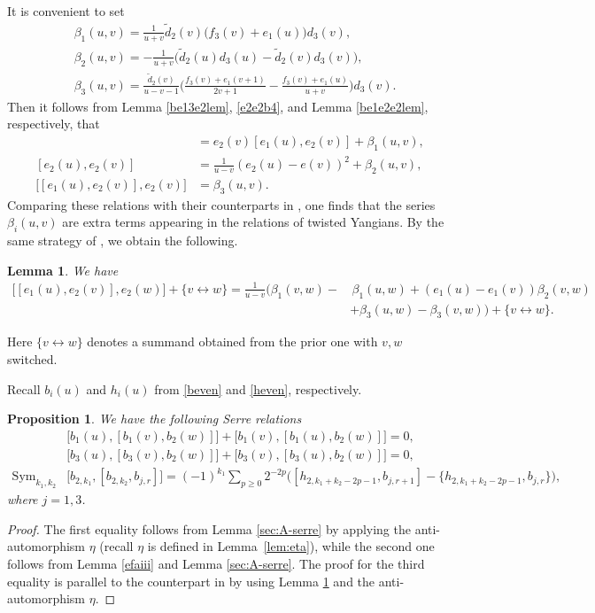 \documentclass[11pt,reqno]{amsart}
\numberwithin{equation}{section}
\newtheorem{prop}[thm]{Proposition}
\newtheorem{lem}[thm]{Lemma}
\theoremstyle{definition}
\theoremstyle{remark}
\newcommand{\tl}{\tilde}
\newcommand{\gge}{\geqslant}
\newcommand{\Sym}{{\mathrm{Sym}}}
\def \Sym{\mathrm{Sym}}
\begin{document}
It is convenient to set
\begin{align*}
&\beta_1(u,v)=\frac{1}{u+v}\tl d_2(v)\big(f_3(v)+e_1(u)\big)d_3(v),\\
&\beta_2(u,v)=-\frac{1}{u+v}\big(\tl d_2(u)d_3(u)-\tl d_2(v)d_3(v)\big),\\
&\beta_3(u,v)=\frac{\tl d_2(v)}{u-v-1}\Big(\frac{f_3(v)+e_1(v+1)}{2v+1}-\frac{f_3(v)+e_1(u)}{u+v}\Big)d_3(v).
\end{align*}
Then it follows from Lemma \ref{be13e2lem}, \eqref{e2e2b4}, and Lemma \ref{be1e2e2lem}, respectively, that
\begin{align}
[e_{13}(u),e_2(v)]&=e_2(v)[e_1(u),e_2(v)]+\beta_1(u,v),\label{beta1b}\\
[e_2(u),e_2(v)]&=\frac{1}{u-v}(e_2(u)-e(v))^2+\beta_2(u,v),\label{beta2b}\\
\big[[e_1(u),e_2(v)],e_2(v)\big]&=\beta_3(u,v).\label{beta3b}
\end{align}
Comparing these relations with their counterparts in \cite[\S5]{BK05}, one finds that the series $\beta_i(u,v)$ are extra terms appearing in the relations of twisted Yangians. By the same strategy of \cite[Lem. 4.9]{KLWZ23a}, we obtain the following.

\begin{lem}\label{serreai}
We have
\[
\begin{split}
\big[[e_1(u),e_2(v)],e_2(w)\big]+\{v\leftrightarrow w\}= \frac{1}{u-v}\Big( \beta_1(v,w)-&\,\beta_1(u,w)+(e_1(u)-e_1(v))\beta_2(v,w)\\
&+\beta_3(u,w)-\beta_3(v,w)\Big)+\{v\leftrightarrow w\}.
\end{split}
\]
\end{lem} 
Here $\{v\leftrightarrow w\}$ denotes a summand obtained from the prior one with $v, w$ switched.

Recall $b_i(u)$ and $h_i(u)$ from \eqref{beven} and \eqref{heven}, respectively.

\begin{prop}
We have the following Serre relations 
\begin{align*}
&\big[b_1(u),[b_1(v),b_2(w)]\big]+\big[b_1(v),[b_1(u),b_2(w)]\big]=0,\\
&\big[b_3(u),[b_3(v),b_2(w)]\big]+\big[b_3(v),[b_3(u),b_2(w)]\big]=0,\\
\Sym_{k_1,k_2}&\big[b_{2,k_1},[b_{2,k_2},b_{j,r}]\big]=(-1)^{k_1}\sum_{p\gge 0}2^{-2p}\big([h_{2,k_1+k_2-2p-1},b_{j,r+1}]-\{h_{2,k_1+k_2-2p-1},b_{j,r}\}\big),
\end{align*}
where $j=1,3$.
\end{prop}
\begin{proof}
The first equality follows from Lemma \ref{sec:A-serre} by applying the anti-automorphism $\eta$ (recall $\eta$ is defined in Lemma~\ref{lem:eta}), while the second one follows from Lemma \ref{efaiii} and Lemma \ref{sec:A-serre}. The proof for the third equality is parallel to the counterpart in \cite[Thm. 4.10]{KLWZ23a} by using Lemma \ref{serreai} and the anti-automorphism $\eta$.
\end{proof}
\end{document}

